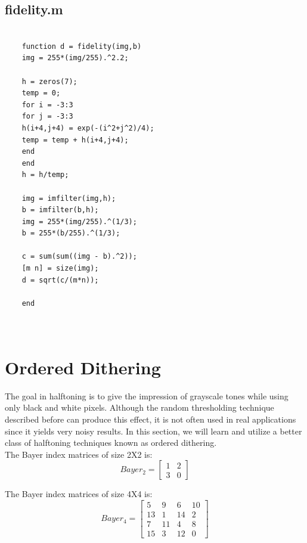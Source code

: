 \documentclass[paper=a4, fontsize=11pt]{scrartcl} %
\numberwithin{equation}{section} %
\numberwithin{figure}{section} %
\numberwithin{table}{section} %
\begin{document}
\subsection{fidelity.m}
\begin{lstlisting}[frame=single]

	function d = fidelity(img,b)
	img = 255*(img/255).^2.2;
	
	h = zeros(7);
	temp = 0;
	for i = -3:3
	for j = -3:3
	h(i+4,j+4) = exp(-(i^2+j^2)/4);
	temp = temp + h(i+4,j+4);
	end
	end
	h = h/temp;
	
	img = imfilter(img,h);
	b = imfilter(b,h);
	img = 255*(img/255).^(1/3);
	b = 255*(b/255).^(1/3);
	
	c = sum(sum((img - b).^2));
	[m n] = size(img);
	d = sqrt(c/(m*n));
	
	end
	
	
\end{lstlisting}

\section{ Ordered Dithering}

The goal in halftoning is to give the impression of grayscale tones while using only black
and white pixels. Although the random thresholding technique described before can
produce this effect, it is not often used in real applications since it yields very noisy results.
In this section, we will learn and utilize a better class of halftoning techniques known as ordered
dithering.
\\
The Bayer index matrices of size 2X2 is:
\[
Bayer_{2} = 
\begin{bmatrix}
     1    & 2\\
3     & 0
\end{bmatrix}
\]

The Bayer index matrices of size 4X4 is:
\[
Bayer_{4} = 
\begin{bmatrix}
     5    & 9   &  6  &  10\\
13   &  1  &  14    & 2\\
7   &11  &   4    & 8\\
15  &  3   & 12   &  0
\end{bmatrix}
\]
\end{document}
